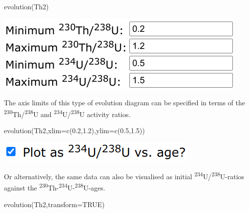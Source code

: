 \begin{refsection}
\begin{enumerate}
\begin{console}
evolution(Th2)
\end{console}

  \noindent\begin{minipage}[t]{.4\linewidth}
  \strut\vspace*{-\baselineskip}\newline
  \includegraphics[width=\linewidth]{../figures/ThUformat12evolutionLimits.png}
  \end{minipage}
  \begin{minipage}[t]{.6\linewidth}
    The axis limits of this type of evolution diagram can be specified in
    terms of the \textsuperscript{230}Th/\textsuperscript{238}U and
    \textsuperscript{234}U/\textsuperscript{238}U activity ratios.
  \end{minipage}

\begin{console}
evolution(Th2,xlim=c(0.2,1.2),ylim=c(0.5,1.5))
\end{console}

  \noindent\begin{minipage}[t]{.3\linewidth}
  \strut\vspace*{-\baselineskip}\newline
  \includegraphics[width=\linewidth]{../figures/ThUvsAge.png}
  \end{minipage}
  \begin{minipage}[t]{.7\linewidth}
    Or alternatively, the same data can also be visualised as
    initial \textsuperscript{234}U/\textsuperscript{238}U-ratios
    against the
    \textsuperscript{230}Th-\textsuperscript{234}U-\textsuperscript{238}U-ages.
  \end{minipage}

\begin{console}
evolution(Th2,transform=TRUE)
\end{console}


\end{enumerate}
\end{refsection}
